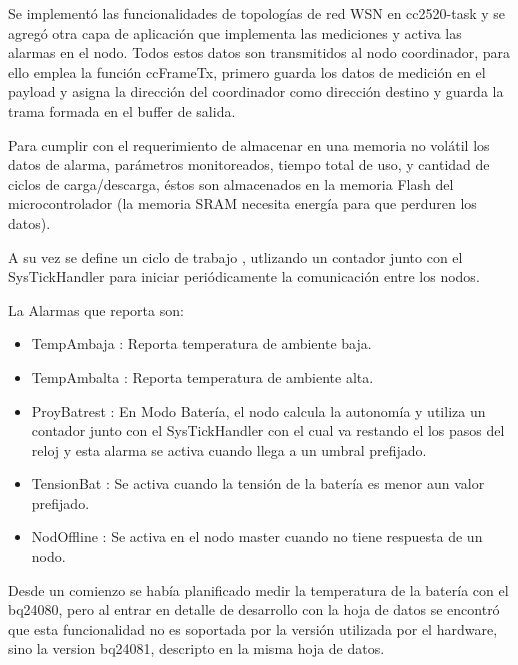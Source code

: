 {%

Se implementó las funcionalidades de topologías de red WSN en cc2520-task y se agregó otra capa de aplicación que implementa las mediciones y activa las alarmas en el nodo. Todos estos datos son transmitidos al nodo coordinador, para ello emplea la función ccFrameTx, primero guarda los datos de medición en el payload y asigna la dirección del coordinador como dirección destino y guarda la trama formada en el buffer de salida.

Para cumplir con el requerimiento de almacenar en una memoria no volátil los datos de alarma, parámetros monitoreados, tiempo total de uso, y cantidad de ciclos de carga/descarga, éstos son almacenados en la memoria Flash del microcontrolador (la memoria SRAM necesita energía para que perduren los datos). 

A su vez se define un ciclo de trabajo , utlizando un contador junto con el SysTickHandler para iniciar periódicamente la comunicación entre los nodos. 

\noindent La Alarmas que reporta son:
	\begin{itemize}
	\item TempAmbaja : Reporta temperatura de ambiente baja.
	\item TempAmbalta : Reporta temperatura de ambiente alta.
	\item ProyBatrest : En Modo Batería, el nodo calcula la autonomía y utiliza un contador junto con el SysTickHandler con el cual va restando el los pasos del reloj y esta alarma se activa cuando llega a un umbral prefijado.
	\item TensionBat : Se activa cuando la tensión de la batería es menor aun valor prefijado.
	\item NodOffline : Se activa en el nodo master cuando no tiene respuesta de un nodo.
	\end{itemize}

Desde un comienzo se había planificado medir la temperatura de la batería con el bq24080, pero al entrar en detalle de desarrollo con la hoja de datos se encontró que esta funcionalidad no es soportada por la versión utilizada por el hardware, sino la version bq24081, descripto en la misma hoja de datos.

}

